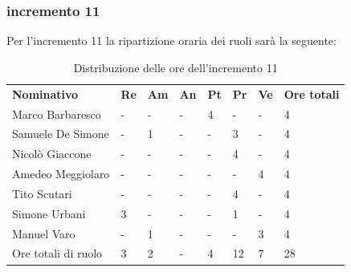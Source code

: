 \subsubsection{incremento 11}
Per l'incremento 11 la ripartizione oraria dei ruoli sarà la seguente:
\begin{center}
    \begin{table}[ht!]
        \centering
        \caption{Distribuzione delle ore dell'incremento 11}
        \vspace{5px}
        \renewcommand{\arraystretch}{1.8}
        \begin{tabular}{p{100px} p{20px} p{20px} p{20px} p{20px} p{20px} p{20px} p{50px} }
            \rowcolor{logo!70} \textbf{Nominativo} & \textbf{Re} & \textbf{Am} & \textbf{An} & \textbf{Pt} & \textbf{Pr} & \textbf{Ve} & \textbf{Ore totali} \\
            Marco Barbaresco                       & -           & -           & -           & 4           & -           & -           & 4                   \\
            Samuele De Simone                      & -           & 1           & -           & -           & 3           & -           & 4                   \\
            Nicolò Giaccone                        & -           & -           & -           & -           & 4           & -           & 4                   \\
            Amedeo Meggiolaro                      & -           & -           & -           & -           & -           & 4           & 4                   \\
            Tito Scutari                           & -           & -           & -           & -           & 4           & -           & 4                   \\
            Simone Urbani                          & 3           & -           & -           & -           & 1           & -           & 4                   \\
            Manuel Varo                            & -           & 1           & -           & -           & -           & 3           & 4                   \\
            Ore totali di ruolo                    & 3           & 2           & -           & 4           & 12          & 7           & 28                  \\
        \end{tabular}
    \end{table}
\end{center}
